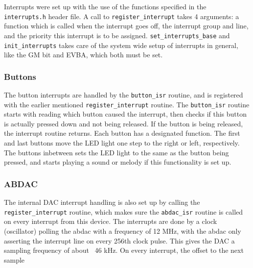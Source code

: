 Interrupts were set up with the use of the functions specified in the \texttt{interrupts.h} header file. A call to \texttt{register\_interrupt} takes 4 arguments: 
a function which is called when the interrupt goes off, the interrupt group and line, and the priority this interrupt is to be assigned. \texttt{set\_interrupts\_base} and \texttt{init\_interrupts} takes care of the system wide setup of interrupts in general, like the GM bit and EVBA, which both must be set.

\subsubsection{Buttons}
The button interrupts are handled by the \texttt{button\_isr} routine, and is registered with the earlier mentioned \texttt{register\_interrupt} routine. The \texttt{button\_isr} routine starts with reading which button caused the interrupt, then checks if this button is actually pressed down and not being released. If the button is being released, the interrupt routine returns.
Each button has a designated function. The first and last buttons move the LED light one step to the right or left, respectively.
The buttons inbetween sets the LED light to the same as the button being pressed, and starts playing a sound or melody if this functionality is set up.

\subsubsection{ABDAC}
The internal DAC interrupt handling is also set up by calling the \texttt{register\_interrupt} routine, which makes sure the \texttt{abdac\_isr} routine is called on every interrupt from this device.
The interrupts are done by a clock (oscillator) polling the abdac with a frequency of 12 MHz, with the abdac only asserting the interrupt line on every 256th clock pulse. 
This gives the DAC a sampling frequency of about ~46 kHz.
On every interrupt, the offset to the next sample 


\subsubsection{}


